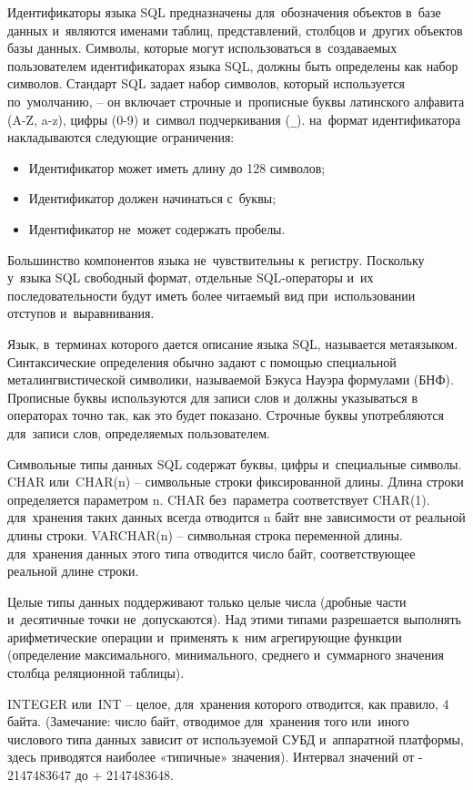 \documentclass{ou}
\begin{document}
Идентификаторы языка SQL предназначены для~обозначения объектов в~базе данных и~являются именами таблиц, представлений, столбцов и~других объектов базы данных. Символы, которые могут использоваться в~создаваемых пользователем идентификаторах языка SQL, должны быть определены как набор символов. Стандарт SQL задает набор символов, который используется по~умолчанию, -- он включает строчные и~прописные буквы латинского алфавита (A-Z, a-z), цифры (0-9) и~символ подчеркивания (\verb+_+). на~формат идентификатора накладываются следующие ограничения: 
\begin{itemize}[label=-, itemindent=4em, nosep]
\item Идентификатор может иметь длину до 128 символов;
\item Идентификатор должен начинаться с~буквы;
\item Идентификатор не~может содержать пробелы.
\end{itemize}

Большинство компонентов языка не~чувствительны к~регистру. Поскольку у~языка SQL свободный формат, отдельные SQL-операторы и~их последовательности будут иметь более читаемый вид при~использовании отступов и~выравнивания. 

Язык, в~терминах которого дается описание языка SQL, называется метаязыком. Синтаксические определения обычно задают с помощью специальной металингвистической символики, называемой Бэкуса Науэра формулами (БНФ). Прописные буквы используются для записи слов и должны указываться в операторах точно так, как это будет показано. Строчные буквы употребляются для~записи слов, определяемых пользователем.
 
Символьные типы данных SQL содержат буквы, цифры и~специальные символы. CHAR или~CHAR(n) -- символьные строки фиксированной длины. Длина строки определяется параметром n. CHAR без~параметра соответствует CHAR(1). для~хранения таких данных всегда отводится n байт вне зависимости от реальной длины строки. VARCHAR(n) -- символьная строка переменной длины. для~хранения данных этого типа отводится число байт, соответствующее реальной длине строки.

Целые типы данных поддерживают только целые числа (дробные части и~десятичные точки не~допускаются). Над этими типами разрешается выполнять арифметические операции и~применять к~ним агрегирующие функции (определение максимального, минимального, среднего и~суммарного значения столбца реляционной таблицы). 

INTEGER или~INT -- целое, для~хранения которого отводится, как правило, 4 байта. (Замечание: число байт, отводимое для~хранения того или~иного числового типа данных зависит от используемой СУБД и~аппаратной платформы, здесь приводятся наиболее «типичные» значения). Интервал значений от - 2147483647 до + 2147483648.
\end{document}
